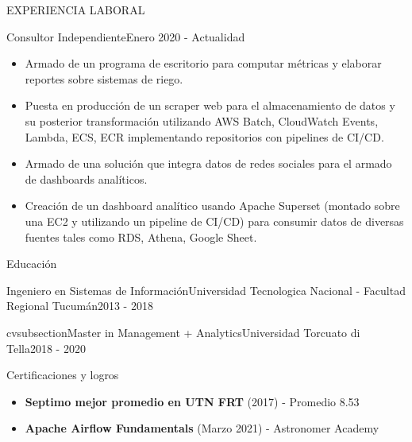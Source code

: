 \documentclass[]{mcdowellcv}
\begin{document}
\begin{cvsection}{EXPERIENCIA LABORAL}
	\begin{cvsubsection}{Consultor Independiente}{}{Enero 2020 - Actualidad}
		\begin{itemize}
			\item Armado de un programa de escritorio para computar métricas y elaborar reportes sobre sistemas de riego.
			\item Puesta en producción de un scraper web para el almacenamiento de datos y su posterior transformación utilizando AWS Batch, CloudWatch Events, Lambda, ECS, ECR implementando repositorios con pipelines de CI/CD.
			\item Armado de una solución que integra datos de redes sociales para el armado de dashboards analíticos.
			\item Creación de un dashboard analítico usando Apache Superset (montado sobre una EC2 y utilizando un pipeline de CI/CD) para consumir datos de diversas fuentes tales como RDS, Athena, Google Sheet.
		\end{itemize}
	\end{cvsubsection}
	
	\begin{cvsection}{Educación}
		\begin{cvsubsection}{Ingeniero en Sistemas de Información}{Universidad Tecnologica Nacional - Facultad Regional Tucumán}{2013 - 2018}
		\end{cvsubsection}
		\begin{cvsubsection}
			{cvsubsection}{Master in Management + Analytics}{Universidad Torcuato di Tella}{2018 - 2020}
		\end{cvsubsection}
	\end{cvsection}
	
	\begin{cvsection}{Certificaciones y logros}
		\begin{cvsubsection}{}{}{}
			\begin{itemize}
				\item \textbf{Septimo mejor promedio en UTN FRT} (2017) - Promedio 8.53
				\item \textbf{Apache Airflow Fundamentals} (Marzo 2021) - Astronomer Academy
			\end{itemize}
		\end{cvsubsection}
	\end{cvsection}
	

\end{cvsection}
\end{document}
